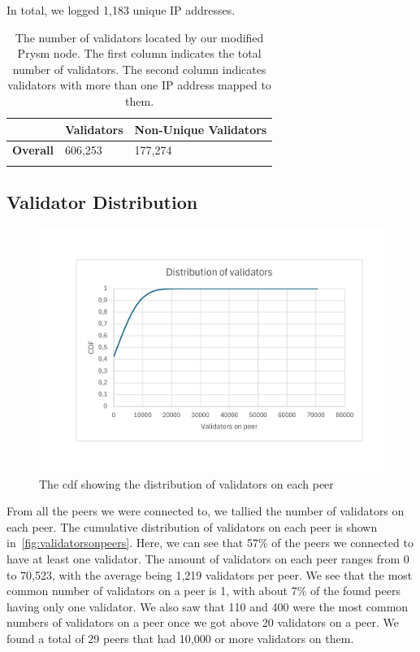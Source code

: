 In total, we logged 1,183 unique IP addresses.


\begin{table}[]
    \centering
    \caption{The number of validators located by our modified Prysm node. The first column indicates the total number of validators. The second column indicates validators with more than one IP address mapped to them.}
    \begin{tabular}{lll}
        \hline
        & \textbf{Validators} & \textbf{Non-Unique Validators} \\ \hline
        \textbf{Overall} & 606,253             & 177,274                        \\ \hline
        \\
    \end{tabular}
    \label{tab:unique vals}
\end{table}

\subsection{Validator Distribution}\label{subsec:validator-distribution}
\begin{figure}[!ht]
    \centering
    \includegraphics[scale = 0.45]{figures/distvalrerun}
    \caption{The cdf showing the distribution of validators on each peer}
    \label{fig:validatorsonpeers}
\end{figure}
From all the peers we were connected to, we tallied the number of validators on each peer.
The cumulative distribution of validators on each peer is shown in~\autoref{fig:validatorsonpeers}.
Here, we can see that 57\% of the peers we connected to have at least one validator.
The amount of validators on each peer ranges from 0 to 70,523, with the average being 1,219 validators per peer.
We see that the most common number of validators on a peer is 1, with about 7\% of the found peers having only one validator.
We also saw that 110 and 400 were the most common numbers of validators on a peer once we got above 20 validators on a peer.
We found a total of 29 peers that had 10,000 or more validators on them.
